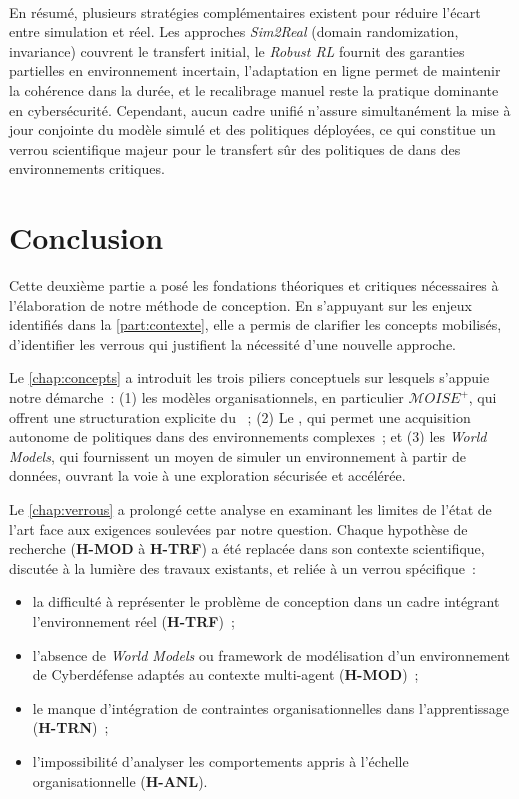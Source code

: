 \

\noindent
En résumé, plusieurs stratégies complémentaires existent
pour réduire l’écart entre simulation et réel.
Les approches \textit{Sim2Real} (domain randomization, invariance)
couvrent le transfert initial,
le \textit{Robust RL} fournit des garanties partielles en environnement incertain,
l’adaptation en ligne permet de maintenir la cohérence dans la durée,
et le recalibrage manuel reste la pratique dominante en cybersécurité.
Cependant, aucun cadre unifié n’assure simultanément
la mise à jour conjointe du modèle simulé et des politiques déployées,
ce qui constitue un verrou scientifique majeur pour le transfert sûr
des politiques de  dans des environnements critiques.



\chapter*{Conclusion}

\noindent
Cette deuxième partie a posé les fondations théoriques et critiques nécessaires à l'élaboration de notre méthode de conception. En s'appuyant sur les enjeux identifiés dans la \autoref{part:contexte}, elle a permis de clarifier les concepts mobilisés, d'identifier les verrous qui justifient la nécessité d'une nouvelle approche.

\medskip

\noindent
Le \autoref{chap:concepts} a introduit les trois piliers conceptuels sur lesquels s'appuie notre démarche~: (1) les modèles organisationnels, en particulier \textit{$\mathcal{M}OISE^+$}, qui offrent une structuration explicite du ~; (2) Le , qui permet une acquisition autonome de politiques dans des environnements complexes~; et (3) les \textit{World Models}, qui fournissent un moyen de simuler un environnement à partir de données, ouvrant la voie à une exploration sécurisée et accélérée.

\noindent
Le \autoref{chap:verrous} a prolongé cette analyse en examinant les limites de l'état de l'art face aux exigences soulevées par notre question. Chaque hypothèse de recherche (\textbf{H-MOD} à \textbf{H-TRF}) a été replacée dans son contexte scientifique, discutée à la lumière des travaux existants, et reliée à un verrou spécifique~:
\begin{itemize}
    \item la difficulté à représenter le problème de conception dans un cadre intégrant l'environnement réel (\textbf{H-TRF})~;
    \item l'absence de \textit{World Models} ou framework de modélisation d'un environnement de Cyberdéfense adaptés au contexte multi-agent (\textbf{H-MOD})~;
    \item le manque d'intégration de contraintes organisationnelles dans l'apprentissage (\textbf{H-TRN})~;
    \item l'impossibilité d'analyser les comportements appris à l'échelle organisationnelle (\textbf{H-ANL}).
\end{itemize}

